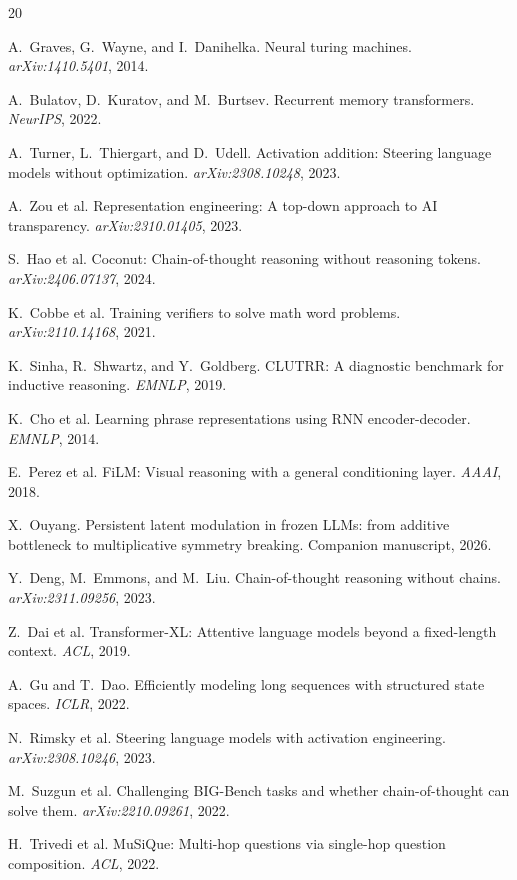 \documentclass[11pt,a4paper]{article}
\begin{document}

\begin{thebibliography}{20}

 A.~Graves, G.~Wayne, and I.~Danihelka.
\newblock Neural turing machines.
\newblock \emph{arXiv:1410.5401}, 2014.

 A.~Bulatov, D.~Kuratov, and M.~Burtsev.
\newblock Recurrent memory transformers.
\newblock \emph{NeurIPS}, 2022.

 A.~Turner, L.~Thiergart, and D.~Udell.
\newblock Activation addition: Steering language models without optimization.
\newblock \emph{arXiv:2308.10248}, 2023.

 A.~Zou et al.
\newblock Representation engineering: A top-down approach to AI transparency.
\newblock \emph{arXiv:2310.01405}, 2023.

 S.~Hao et al.
\newblock Coconut: Chain-of-thought reasoning without reasoning tokens.
\newblock \emph{arXiv:2406.07137}, 2024.

 K.~Cobbe et al.
\newblock Training verifiers to solve math word problems.
\newblock \emph{arXiv:2110.14168}, 2021.

 K.~Sinha, R.~Shwartz, and Y.~Goldberg.
\newblock CLUTRR: A diagnostic benchmark for inductive reasoning.
\newblock \emph{EMNLP}, 2019.

 K.~Cho et al.
\newblock Learning phrase representations using RNN encoder-decoder.
\newblock \emph{EMNLP}, 2014.

 E.~Perez et al.
\newblock FiLM: Visual reasoning with a general conditioning layer.
\newblock \emph{AAAI}, 2018.

 X.~Ouyang.
\newblock Persistent latent modulation in frozen LLMs: from additive bottleneck to multiplicative symmetry breaking.
\newblock Companion manuscript, 2026.

 Y.~Deng, M.~Emmons, and M.~Liu.
\newblock Chain-of-thought reasoning without chains.
\newblock \emph{arXiv:2311.09256}, 2023.

 Z.~Dai et al.
\newblock Transformer-XL: Attentive language models beyond a fixed-length context.
\newblock \emph{ACL}, 2019.

 A.~Gu and T.~Dao.
\newblock Efficiently modeling long sequences with structured state spaces.
\newblock \emph{ICLR}, 2022.

 N.~Rimsky et al.
\newblock Steering language models with activation engineering.
\newblock \emph{arXiv:2308.10246}, 2023.

 M.~Suzgun et al.
\newblock Challenging BIG-Bench tasks and whether chain-of-thought can solve them.
\newblock \emph{arXiv:2210.09261}, 2022.

 H.~Trivedi et al.
\newblock MuSiQue: Multi-hop questions via single-hop question composition.
\newblock \emph{ACL}, 2022.

\end{thebibliography}
\end{document}
